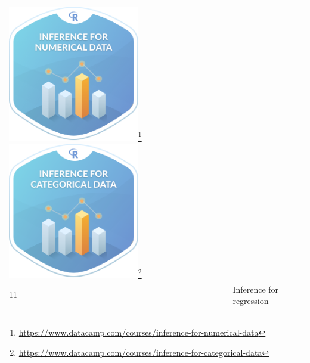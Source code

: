 \documentclass[12pt, krantz2,]{krantz}
\renewcommand{\href}[2]{#2\footnote{\url{#1}}}
\begin{document}
\begin{longtable}[]{@{}lll@{}}
\begin{minipage}[t]{0.30\columnwidth}
\href{https://www.datacamp.com/courses/inference-for-numerical-data}{\includegraphics[width=0.6\textwidth]{images/datacamp_inference_for_numerical_data.png}} \href{https://www.datacamp.com/courses/inference-for-categorical-data}{\includegraphics[width=0.6\textwidth]{images/datacamp_inference_for_categorical_data.png}}\strut
\end{minipage}\tabularnewline
\begin{minipage}[t]{0.30\columnwidth}\raggedright
11\strut
\end{minipage} & \begin{minipage}[t]{0.30\columnwidth}\raggedright
Inference for regression\strut
\end{minipage} & \begin{minipage}[t]{0.30\columnwidth}\raggedright

\end{minipage}
\end{longtable}
\end{document}
